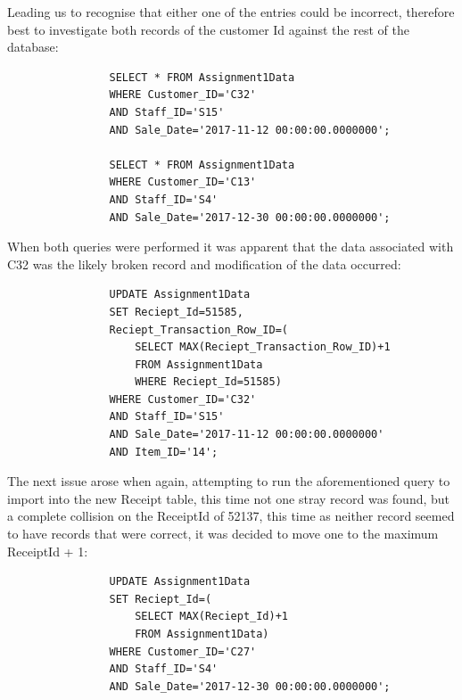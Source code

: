 \documentclass{article}
\begin{document}
            Leading us to recognise that either one of the entries could be incorrect, therefore
            best to investigate both records of the customer Id against the rest of the database:

            \begin{lstlisting}
                SELECT * FROM Assignment1Data 
                WHERE Customer_ID='C32' 
                AND Staff_ID='S15' 
                AND Sale_Date='2017-11-12 00:00:00.0000000';
            
                SELECT * FROM Assignment1Data 
                WHERE Customer_ID='C13' 
                AND Staff_ID='S4' 
                AND Sale_Date='2017-12-30 00:00:00.0000000';
            \end{lstlisting}

            When both queries were performed it was apparent that the data associated with C32 was 
            the likely broken record and modification of the data occurred:

            \begin{lstlisting}
                UPDATE Assignment1Data 
                SET Reciept_Id=51585, 
                Reciept_Transaction_Row_ID=(
                    SELECT MAX(Reciept_Transaction_Row_ID)+1 
                    FROM Assignment1Data
                    WHERE Reciept_Id=51585)
                WHERE Customer_ID='C32' 
                AND Staff_ID='S15' 
                AND Sale_Date='2017-11-12 00:00:00.0000000' 
                AND Item_ID='14';
            \end{lstlisting}

            \newpage

            The next issue arose when again, attempting to run the aforementioned query to import
            into the new Receipt table, this time not one stray record was found, but a complete
            collision on the ReceiptId of 52137, this time as neither record seemed to have 
            records that were correct, it was decided to move one to the maximum ReceiptId + 1:

            \begin{lstlisting}
                UPDATE Assignment1Data 
                SET Reciept_Id=(
                    SELECT MAX(Reciept_Id)+1 
                    FROM Assignment1Data) 
                WHERE Customer_ID='C27' 
                AND Staff_ID='S4' 
                AND Sale_Date='2017-12-30 00:00:00.0000000';
            \end{lstlisting}
\end{document}
